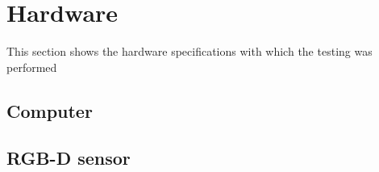 \chapter{Hardware }
This section shows the hardware specifications with which the testing was performed

\section{Computer}

\section{RGB-D sensor}

